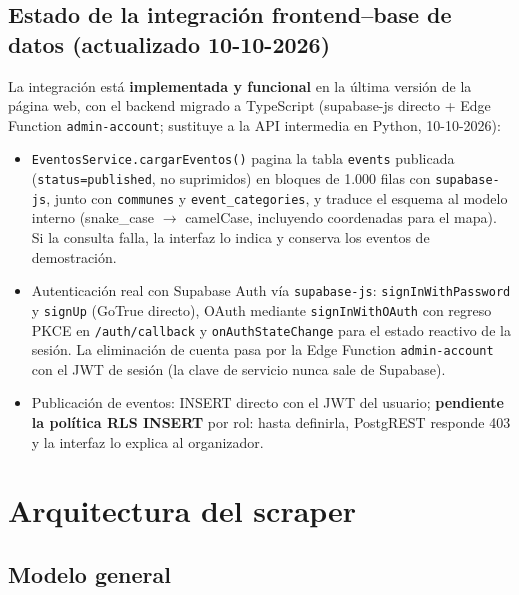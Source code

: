 \subsection{Estado de la integración frontend--base de datos (actualizado 10-10-2026)}

La integración está \textbf{implementada y funcional} en la última versión de la
página web, con el backend migrado a TypeScript (supabase-js directo + Edge Function
\texttt{admin-account}; sustituye a la API intermedia en Python, 10-10-2026):

\begin{itemize}[leftmargin=1.4em]
    \item \texttt{EventosService.cargarEventos()} pagina la tabla \texttt{events}
    publicada (\texttt{status=published}, no suprimidos) en bloques de 1.000 filas
    con \texttt{supabase-js}, junto con \texttt{communes} y \texttt{event\_categories},
    y traduce el esquema al modelo interno (snake\_case $\rightarrow$ camelCase,
    incluyendo coordenadas para el mapa). Si la consulta falla, la interfaz lo
    indica y conserva los eventos de demostración.
    \item Autenticación real con Supabase Auth vía \texttt{supabase-js}:
    \texttt{signInWithPassword} y \texttt{signUp} (GoTrue directo), OAuth mediante
    \texttt{signInWithOAuth} con regreso PKCE en \texttt{/auth/callback} y
    \texttt{onAuthStateChange} para el estado reactivo de la sesión. La eliminación
    de cuenta pasa por la Edge Function \texttt{admin-account} con el JWT de sesión
    (la clave de servicio nunca sale de Supabase).
    \item Publicación de eventos: INSERT directo con el JWT del usuario;
    \textbf{pendiente la política RLS INSERT} por rol: hasta definirla, PostgREST
    responde 403 y la interfaz lo explica al organizador.
\end{itemize}

\section{Arquitectura del scraper}
\label{sec:scraper}

\subsection{Modelo general}

